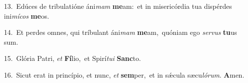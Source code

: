 {\numbfont\textcolor{\numbcolor}{13.}}~Edúces de tribulatióne áni\textit{mam} \textbf{me}\-am:~\star et in misericórdia tua dispérdes ini\-\textit{mí}\-\textit{cos} \textbf{me}\-os.\par
{\numbfont\textcolor{\numbcolor}{14.}}~Et perdes omnes, qui tríbulant áni\textit{mam} \textbf{me}\-am,~\star quóniam ego \textit{ser}\-\textit{vus} \textbf{tu}\-us sum.\par
{\numbfont\textcolor{\numbcolor}{15.}}~Glória Patri, \textit{et} \textbf{Fí}\-lio,~\star et Spirí\-\textit{tu}\-\textit{i} \textbf{Sanc}\-to.\par
{\numbfont\textcolor{\numbcolor}{16.}}~Sicut erat in princípio, et nunc, \textit{et} \textbf{sem}\-per,~\star et in sǽcula sæcu\-\textit{ló}\-\textit{rum}. \textbf{A}\-men.\par
